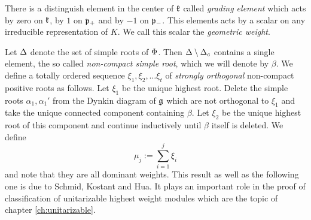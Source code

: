 
There is a distinguish element in the center of $\mathfrak{k}$ called \emph{grading element} which acts by zero on $\mathfrak{k}$, by $1$ on $\mathfrak{p}_+$ and by $-1$ on $\mathfrak{p}_-$. This elements acts by a scalar on any irreducible representation of $K$. We call this scalar the \emph{geometric weight}.

Let $\Delta$ denote the set of  simple roots of $\Phi$. Then $\Delta\setminus \Delta_c$ contains a single element, the so called \emph{non-compact simple root}, which we will denote by $\beta$. We define a totally ordered sequence $\xi_1,\xi_2,\ldots \xi_t$ of \emph{strongly orthogonal} non-compact positive roots as follows. Let $\xi_1$ be the unique highest root. Delete the simple roots $\alpha_1,\alpha_1'$ from the Dynkin diagram of $\mathfrak{g}$ which are not orthogonal to $\xi_1$ and take the unique connected component containing $\beta$. Let $\xi_2$ be the unique highest root of this component and continue inductively until $\beta$ itself is deleted. We define
\[\mu_j := \sum_{i=1}^j \xi_i\]
and note that they are all dominant weights. This result as well as the following one is due to Schmid, Kostant and Hua. It plays an important role in the proof of classification of unitarizable highest weight modules \cite{enright_intrinsic_1990} which are the topic of chapter \ref{ch:unitarizable}.

